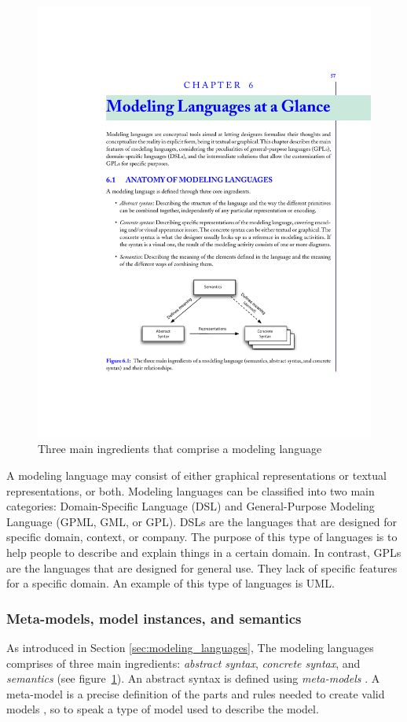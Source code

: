\begin{figure}[H]
\centering
\captionsetup{justification=centering}
\vspace{0cm}%
\includegraphics[width=0.6\linewidth]{figure/literatures/brambilla_modeling.pdf}
\caption{Three main ingredients that comprise a modeling language \cite{Brambilla}}
\label{fig:brambilla-modeling}
\end{figure}

A modeling language may consist of either graphical representations or textual representations, or both. Modeling languages can be classified into two main categories: Domain-Specific Language (DSL) and General-Purpose Modeling Language (GPML, GML, or GPL). DSLs are the languages that are designed for specific domain, context, or company. The purpose of this type of languages is to help people to describe and explain things in a certain domain. In contrast, GPLs are the languages that are designed for general use. They lack of specific features for a specific domain. An example of this type of languages is UML. \\

\subsubsection{Meta-models, model instances, and semantics}
As introduced in Section \ref{sec:modeling_languages}, The modeling languages comprises of three main ingredients: \textit{abstract syntax}, \textit{concrete syntax}, and \textit{semantics} (see figure~\ref{fig:brambilla-modeling}). An abstract syntax is defined using \textit{meta-models} \cite{Brambilla}. A meta-model is a precise definition of the parts and rules needed to create valid models \cite{Tichy}, so to speak a type of model used to describe the model.

